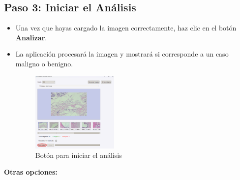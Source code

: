 \documentclass[12pt]{article} %
\begin{document}
\subsection*{Paso 3: Iniciar el Análisis}

\begin{itemize}
    \item Una vez que hayas cargado la imagen correctamente, haz clic en el botón \textbf{Analizar}.
    \item La aplicación procesará la imagen y mostrará si corresponde a un caso maligno o benigno.
    \begin{figure}[!ht]
        \centering
        \includegraphics[width=0.4\textwidth]{IniciarAnalisis.png}
        \caption{Botón para iniciar el análisis}
        \label{fig:iniciar_analisis}
    \end{figure}
\end{itemize}
\newpage
\textbf{Otras opciones:}
\end{document}
